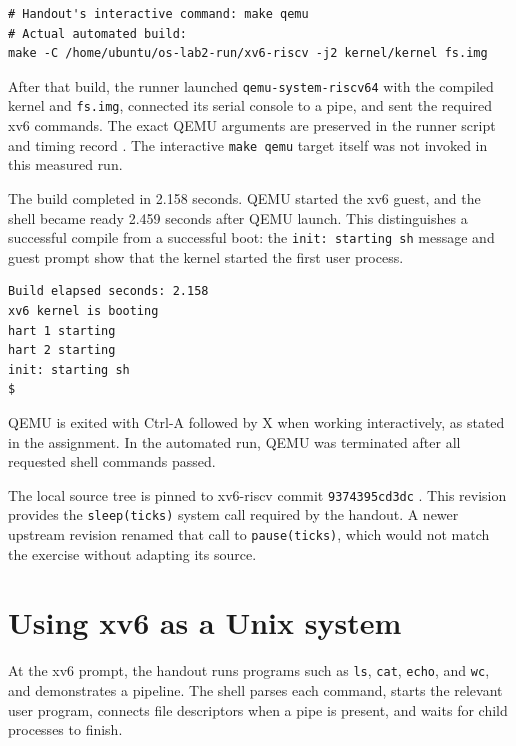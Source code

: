 \documentclass{assets/utmreport}
\begin{document}
\noindent\begin{minipage}{\linewidth}
\begin{lstlisting}[caption={The handout command and the equivalent automated build}]
# Handout's interactive command: make qemu
# Actual automated build:
make -C /home/ubuntu/os-lab2-run/xv6-riscv -j2 kernel/kernel fs.img
\end{lstlisting}
\end{minipage}\par


After that build, the runner launched \texttt{qemu-system-riscv64} with the compiled kernel and \texttt{fs.img}, connected its serial console to a pipe, and sent the required xv6 commands. The exact QEMU arguments are preserved in the runner script and timing record \cite{lab2evidence}. The interactive \texttt{make qemu} target itself was not invoked in this measured run.

The build completed in 2.158 seconds. QEMU started the xv6 guest, and the shell became ready 2.459 seconds after QEMU launch. This distinguishes a successful compile from a successful boot: the \texttt{init: starting sh} message and guest prompt show that the kernel started the first user process.

\noindent\begin{minipage}{\linewidth}
\begin{lstlisting}[caption={Captured xv6 boot sequence}]
Build elapsed seconds: 2.158
xv6 kernel is booting
hart 1 starting
hart 2 starting
init: starting sh
$
\end{lstlisting}
\end{minipage}\par


QEMU is exited with Ctrl-A followed by X when working interactively, as stated in the assignment. In the automated run, QEMU was terminated after all requested shell commands passed.

The local source tree is pinned to xv6-riscv commit \texttt{9374395cd3dc} \cite{xv6}. This revision provides the \texttt{sleep(ticks)} system call required by the handout. A newer upstream revision renamed that call to \texttt{pause(ticks)}, which would not match the exercise without adapting its source.

\section{Using xv6 as a Unix system}

At the xv6 prompt, the handout runs programs such as \texttt{ls}, \texttt{cat}, \texttt{echo}, and \texttt{wc}, and demonstrates a pipeline. The shell parses each command, starts the relevant user program, connects file descriptors when a pipe is present, and waits for child processes to finish.
\end{document}

